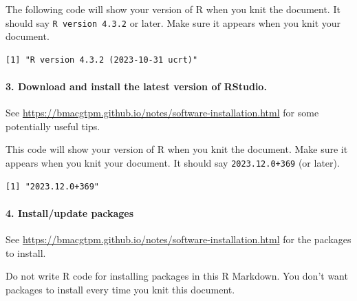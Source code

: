 \documentclass[
]{article}
\newenvironment{Shaded}{\begin{snugshade}}{\end{snugshade}}
\newcommand{\FunctionTok}[1]{\textcolor[rgb]{0.13,0.29,0.53}{\textbf{#1}}}
\newcommand{\NormalTok}[1]{#1}
\newcommand{\SpecialCharTok}[1]{\textcolor[rgb]{0.81,0.36,0.00}{\textbf{#1}}}
\begin{document}
The following code will show your version of R when you knit the
document. It should say \texttt{R\ version\ 4.3.2} or later. Make sure
it appears when you knit your document.

\begin{Shaded}
\end{Shaded}

\begin{verbatim}
[1] "R version 4.3.2 (2023-10-31 ucrt)"
\end{verbatim}

\hypertarget{download-and-install-the-latest-version-of-rstudio.}{%
\paragraph{3. Download and install the latest version of
RStudio.}\label{download-and-install-the-latest-version-of-rstudio.}}

See \url{https://bmacgtpm.github.io/notes/software-installation.html}
for some potentially useful tips.

This code will show your version of R when you knit the document. Make
sure it appears when you knit your document. It should say
\texttt{2023.12.0+369} (or later).

\begin{Shaded}
\end{Shaded}

\begin{verbatim}
[1] "2023.12.0+369"
\end{verbatim}

\hypertarget{installupdate-packages}{%
\paragraph{4. Install/update packages}\label{installupdate-packages}}

See \url{https://bmacgtpm.github.io/notes/software-installation.html}
for the packages to install.

Do not write R code for installing packages in this R Markdown. You
don't want packages to install every time you knit this document.
\end{document}
